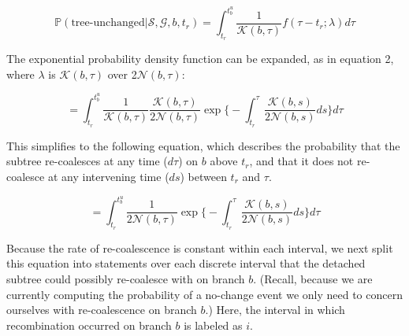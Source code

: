 \documentclass[11pt]{article}
\begin{document}
\begin{equation}
	\mathbb{P}(\textrm{tree-unchanged} | \mathcal{S}, \mathcal{G}, b, t_r) = 
	\int_{t_r}^{t_b^u} \frac{1}{\mathcal{K}(b,\tau)} f(\tau - t_r; \lambda) d\tau
\end{equation}

\noindent The exponential probability density function can be expanded, as in 
equation 2, where $\lambda$ is $\mathcal{K}(b,\tau)$ over 
2$\mathcal{N}(b,\tau)$:

\begin{equation}
	= \int_{t_r}^{t_b^u} 
	\frac{1}{\mathcal{K}(b,\tau)} 
	\frac{\mathcal{K}(b,\tau)}{2\mathcal{N}(b,\tau)}
	\exp \bigg\{
		-\int_{t_r}^{\tau} \frac{\mathcal{K}(b,s)}{2\mathcal{N}(b,s)}ds
		\bigg\} d\tau
\end{equation}

\noindent This simplifies to the following equation, which describes the probability that
the subtree re-coalesces at any time ($d\tau$) on $b$ above $t_r$, and 
that it does not re-coalesce at any intervening time ($ds$) between 
$t_r$ and $\tau$.

\begin{equation}
	= \int_{t_r}^{t_b^u}
	\frac{1}{2\mathcal{N}(b,\tau)}
	\exp \bigg\{
		-\int_{t_r}^{\tau} \frac{\mathcal{K}(b,s)}{2\mathcal{N}(b,s)}ds
		\bigg\} d\tau
\end{equation}

\noindent Because the rate of re-coalescence is constant within each interval, 
we next split this equation into statements over each discrete interval that the
detached subtree could possibly re-coalesce with on branch $b$. (Recall, because
we are currently computing the probability of a no-change event we only need
to concern ourselves with re-coalescence on branch $b$.)
Here, the interval in which recombination occurred on branch $b$ is labeled
as $i$. 
\end{document}
